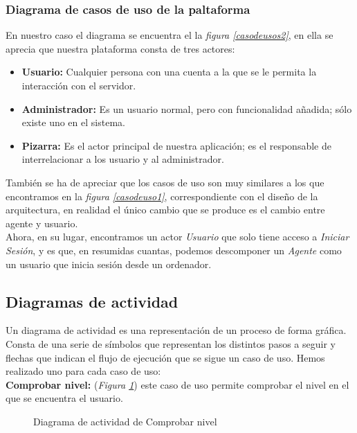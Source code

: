 \subsubsection{Diagrama de casos de uso de la paltaforma}

En nuestro caso el diagrama se encuentra el la \emph{figura \ref{casodeusos2}}, en ella se aprecia que nuestra plataforma consta de tres actores:

\begin{itemize}
\item \textbf{Usuario:} Cualquier persona con una cuenta a la que se le permita la interacción con el servidor.
\item \textbf{Administrador:} Es un usuario normal, pero con funcionalidad añadida; sólo existe uno en el sistema.
\item \textbf{Pizarra:} Es el actor principal de nuestra aplicación; es el responsable de interrelacionar a los usuario y al administrador.   
\end{itemize}

También se ha de apreciar que los casos de uso son muy similares a los que encontramos en la \emph{figura \ref{casodeuso1}}, correspondiente con el diseño de la arquitectura, en realidad el único cambio que se produce es el cambio entre agente y usuario.\\

Ahora, en su lugar, encontramos un actor \emph{Usuario} que solo tiene acceso a \emph{Iniciar Sesión}, y es que, en resumidas cuantas, podemos descomponer un \emph{Agente} como un usuario que inicia sesión desde un ordenador.

\begin{sidewaysfigure}
\centering
\casos
\caption{Diagrama de casos de uso}
\label{casodeusos2}
\end{sidewaysfigure}

\newpage

\subsection{Diagramas de actividad}
Un diagrama de actividad es una representación de un proceso de forma gráfica. Consta de una serie de símbolos que representan los distintos pasos a seguir y flechas que indican el flujo de ejecución que se sigue un caso de uso. Hemos realizado uno para cada caso de uso:\\

\textbf{Comprobar nivel:} (\emph{Figura \ref{fig:comprobarNivel}}) este caso de uso permite comprobar el nivel en el que se encuentra el usuario.
\begin{figure}[H]
\centering
\comprobarNivel
\caption{Diagrama de actividad de Comprobar nivel}
\label{fig:comprobarNivel}
\end{figure}
\newpage

